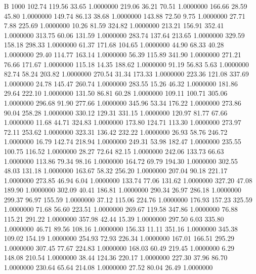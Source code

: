 


B 1000
 102.74  119.56   33.65   1.0000000
 219.06   36.21   70.51   1.0000000
 166.66   28.59   45.80   1.0000000
 149.74   86.13   38.68   1.0000000
 143.88   72.50    9.75   1.0000000
  27.71    7.88  225.69   1.0000000
  10.26   81.59  324.82   1.0000000
 213.21  156.91  352.41   1.0000000
 313.75   60.06  131.59   1.0000000
 283.74  137.64  213.65   1.0000000
 329.59  158.18  298.33   1.0000000
  61.37  171.68  104.65   1.0000000
  44.90   68.33   40.28   1.0000000
  29.40  114.77  163.14   1.0000000
  56.39  115.89  341.90   1.0000000
 271.21   76.66  171.67   1.0000000
 115.18   14.35  188.62   1.0000000
  91.19   56.83    5.63   1.0000000
  82.74   58.24  203.82   1.0000000
 270.54   31.34  173.33   1.0000000
 223.36  121.08  337.69   1.0000000
  24.78  145.47  260.74   1.0000000
 283.55   15.26   46.32   1.0000000
 181.86   29.64  222.10   1.0000000
 131.50   86.81   60.28   1.0000000
 109.11  100.71  305.06   1.0000000
 296.68   91.90  277.66   1.0000000
 345.96   53.34  176.22   1.0000000
 273.86   90.04  258.28   1.0000000
 330.12  129.31  331.15   1.0000000
 120.97   81.77   67.66   1.0000000
  11.68   44.71  324.83   1.0000000
 173.80  124.71  113.30   1.0000000
 273.97   72.11  253.62   1.0000000
 323.31  136.42  232.22   1.0000000
  26.93   58.76  246.72   1.0000000
  16.79  142.74  218.94   1.0000000
 249.31   53.98  182.47   1.0000000
 235.55  100.75  116.52   1.0000000
  28.27   72.64   82.15   1.0000000
 242.06  133.73   66.63   1.0000000
 113.86   79.34   98.16   1.0000000
 164.72   69.79  194.30   1.0000000
 302.55   48.03  131.18   1.0000000
 163.67   58.32  256.20   1.0000000
 207.04   90.18  221.17   1.0000000
 273.85   46.94    6.04   1.0000000
 133.74   77.06  131.62   1.0000000
 327.20   47.08  189.90   1.0000000
 302.09   40.41  186.81   1.0000000
 290.34   26.97  286.18   1.0000000
 299.37   96.97  155.59   1.0000000
  37.12  115.06  224.76   1.0000000
 176.93  157.23  325.59   1.0000000
  71.68   56.60  223.51   1.0000000
 269.67  119.58  347.86   1.0000000
  76.88  115.21  291.22   1.0000000
 357.98   42.44   15.39   1.0000000
 297.50    6.03  335.80   1.0000000
  46.71   89.56  108.16   1.0000000
 156.33   11.11  351.16   1.0000000
 345.38  109.02  154.19   1.0000000
 254.93   72.93  226.34   1.0000000
 167.01  166.51  295.29   1.0000000
 307.45   77.67  224.83   1.0000000
 168.03   60.49  219.45   1.0000000
   6.29  148.08  210.54   1.0000000
  38.44  124.36  220.17   1.0000000
 227.30   37.96   86.70   1.0000000
 230.64   65.64  214.08   1.0000000
  27.52   80.04   26.49   1.0000000

